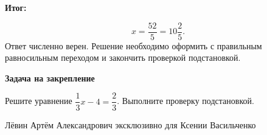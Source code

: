 \documentclass[11pt,a4paper]{article}
\newcommand{\reviewpart}[1]{\par\smallskip\textbf{#1}\par\smallskip}
\begin{document}
\reviewpart{\textcolor{teal!60!black}{Итог:}}
\[
\boxed{x=\frac{52}{5}=10\frac25.}
\]
Ответ численно верен. Решение необходимо оформить с правильным равносильным переходом и закончить проверкой подстановкой.

\reviewpart{Задача на закрепление}
Решите уравнение $\dfrac13x-4=\dfrac23$. Выполните проверку подстановкой.

\vfill
\begin{center}
\footnotesize Лёвин Артём Александрович эксклюзивно для Ксении Васильченко
\end{center}
\end{document}
